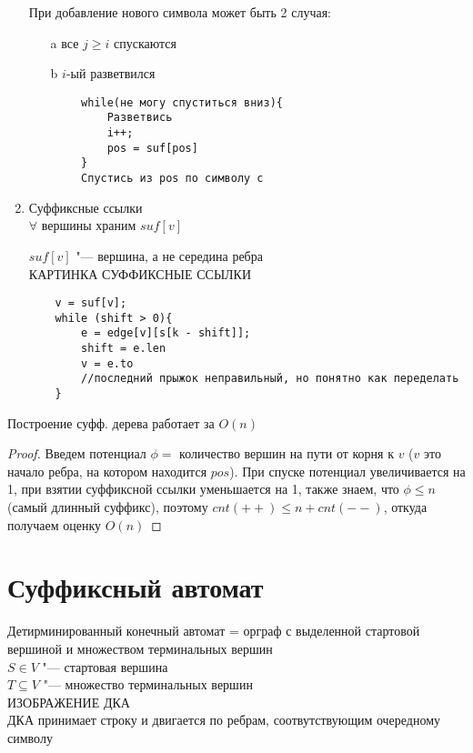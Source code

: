 \begin{enumerate}
	При добавление нового символа может быть 2 случая:
	\begin{itemize}
	\item[a]
		все $j \geqslant i$ спускаются
	\item[b]
		$i$-ый разветвился
	\end{itemize}
	\begin{verbatim}
		while(не могу спуститься вниз){
			Разветвись
			i++;
			pos = suf[pos]
		}
		Спустись из pos по символу c
	\end{verbatim}
\item
	Суффиксные ссылки \\
	$\forall$ вершины храним $suf[v]$
	\begin{lemma}
		$suf[v]$ "--- вершина, а не середина ребра \\
		КАРТИНКА СУФФИКСНЫЕ ССЫЛКИ \\
	\end{lemma}
	\begin{verbatim}
	v = suf[v];
	while (shift > 0){
		e = edge[v][s[k - shift]];
		shift = e.len
		v = e.to
		//последний прыжок неправильный, но понятно как переделать
	}
	\end{verbatim}
\end{enumerate}

\begin{theorem}
	Построение суфф. дерева работает за $O(n)$
\end{theorem}
\begin{proof}
	Введем потенциал $\phi =$ количество вершин на пути от корня к $v$ ($v$ это начало ребра, на котором находится $pos$). При спуске потенциал увеличивается на 1, при взятии суффиксной ссылки уменьшается на 1, также знаем, что $\phi \leqslant n$ (самый длинный суффикс), поэтому $cnt(++) \leqslant n + cnt(--)$, откуда получаем оценку $O(n)$
\end{proof}

\section{Суффиксный автомат}

\begin{Def}
	Детирминированный конечный автомат = орграф с выделенной стартовой вершиной и множеством терминальных вершин \\
	$S \in V$ "--- стартовая вершина \\
	$T \subseteq V$ "--- множество терминальных вершин \\
	ИЗОБРАЖЕНИЕ ДКА \\
	ДКА принимает строку и двигается по ребрам, соотвутствующим очередному символу
\end{Def}

